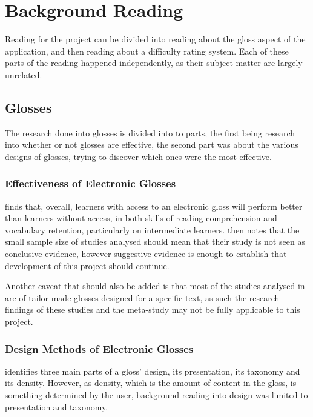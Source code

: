 \chapter{Background Reading}

Reading for the project can be divided into reading about the gloss aspect of the application, and then reading about a difficulty rating system. Each of these parts of the reading happened independently, as their subject matter are largely unrelated.


\section{Glosses}

The research done into glosses is divided into to parts, the first being research into whether or not glosses are effective, the second part was about the various designs of glosses, trying to discover which ones were the most effective.

\subsection{Effectiveness of Electronic Glosses}

\textcite{abraham2008} finds that, overall, learners with access to an electronic gloss will perform better than learners without access, in both skills of reading comprehension and vocabulary retention, particularly on intermediate learners. \textcite{abraham2008} then notes that the small sample size of studies analysed should mean that their study is not seen as conclusive evidence, however suggestive evidence is enough to establish that development of this project should continue.

Another caveat that should also be added is that most of the studies analysed in \textcite{abraham2008} are of tailor-made glosses designed for a specific text, as such the research findings of these studies and the meta-study may not be fully applicable to this project.


\subsection{Design Methods of Electronic Glosses}

\textcite{roby1999} identifies three main parts of a gloss' design, its presentation, its taxonomy and its density. However, as density, which is the amount of content in the gloss, is something determined by the user, background reading into design was limited to presentation and taxonomy. 


